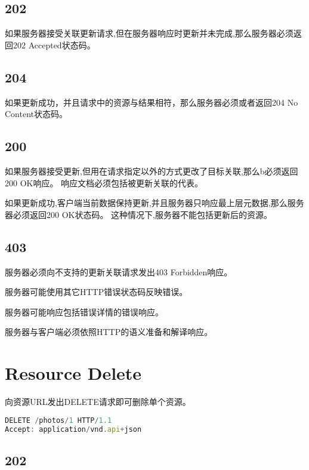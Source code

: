 \subsection{202}

如果服务器接受关联更新请求,但在服务器响应时更新并未完成,那么服务器必须返回202 Accepted状态码。

\subsection{204}

如果更新成功，并且请求中的资源与结果相符，那么服务器必须或者返回204 No Content状态码。

\subsection{200}

如果服务器接受更新,但用在请求指定以外的方式更改了目标关联,那么b必须返回200 OK响应。 响应文档必须包括被更新关联的代表。

如果更新成功,客户端当前数据保持更新,并且服务器只响应最上层元数据,那么服务器必须返回200 OK状态码。 这种情况下,服务器不能包括更新后的资源。

\subsection{403}

服务器必须向不支持的更新关联请求发出403 Forbidden响应。

服务器可能使用其它HTTP错误状态码反映错误。

服务器可能响应包括错误详情的错误响应。

服务器与客户端必须依照HTTP的语义准备和解译响应。


\section{Resource Delete}


向资源URL发出DELETE请求即可删除单个资源。




\begin{lstlisting}[language=JavaScript]
DELETE /photos/1 HTTP/1.1
Accept: application/vnd.api+json
\end{lstlisting}


\subsection{202}

